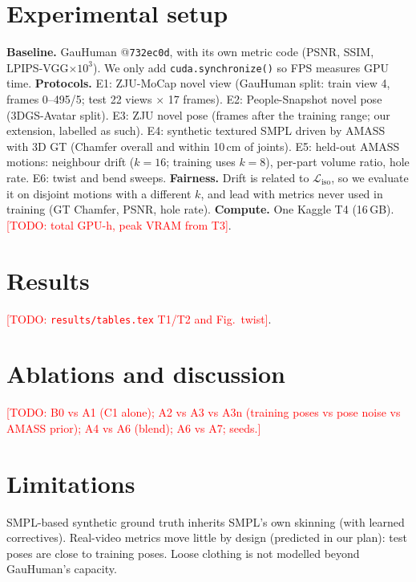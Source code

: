 \documentclass[10pt,twocolumn]{article}
\newcommand{\TODO}[1]{\textcolor{red}{[TODO: #1]}}
\begin{document}
\section{Experimental setup}
\textbf{Baseline.} GauHuman @\texttt{732ec0d}, with its own metric code (PSNR, SSIM, LPIPS-VGG$\times10^3$). We only add
\texttt{cuda.synchronize()} so FPS measures GPU time.
\textbf{Protocols.}
E1: ZJU-MoCap novel view (GauHuman split: train view 4, frames 0--495/5; test 22 views $\times$ 17 frames).
E2: People-Snapshot novel pose (3DGS-Avatar split).
E3: ZJU novel pose (frames after the training range; our extension, labelled as such).
E4: synthetic textured SMPL driven by AMASS with 3D GT (Chamfer overall and within 10\,cm of joints).
E5: held-out AMASS motions: neighbour drift ($k{=}16$; training uses $k{=}8$), per-part volume ratio, hole rate.
E6: twist and bend sweeps.
\textbf{Fairness.} Drift is related to $\mathcal L_\mathrm{iso}$, so we evaluate it on disjoint motions with a different
$k$, and lead with metrics never used in training (GT Chamfer, PSNR, hole rate).
\textbf{Compute.} One Kaggle T4 (16\,GB). \TODO{total GPU-h, peak VRAM from T3}.

\section{Results}
\TODO{\texttt{results/tables.tex} T1/T2 and Fig.~twist}.
% 

\section{Ablations and discussion}
\TODO{B0 vs A1 (C1 alone); A2 vs A3 vs A3n (training poses vs pose noise vs AMASS prior); A4 vs A6 (blend); A6 vs A7;
seeds.}

\section{Limitations}
SMPL-based synthetic ground truth inherits SMPL's own skinning (with learned correctives). Real-video metrics move
little by design (predicted in our plan): test poses are close to training poses. Loose clothing is not modelled
beyond GauHuman's capacity.



\end{document}
